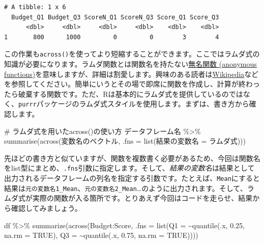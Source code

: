 \documentclass[
  a4paper,
  pandoc,
  ja=standard,
  jafont=haranoaji]{bxjsbook}
\newenvironment{Shaded}{\begin{snugshade}}{\end{snugshade}}
\newcommand{\AttributeTok}[1]{\textcolor[rgb]{0.00,0.48,0.65}{#1}}
\newcommand{\CommentTok}[1]{\textcolor[rgb]{0.37,0.37,0.37}{#1}}
\newcommand{\ConstantTok}[1]{\textcolor[rgb]{0.56,0.35,0.01}{#1}}
\newcommand{\FloatTok}[1]{\textcolor[rgb]{0.68,0.00,0.00}{#1}}
\newcommand{\FunctionTok}[1]{\textcolor[rgb]{0.28,0.35,0.67}{#1}}
\newcommand{\NormalTok}[1]{\textcolor[rgb]{0.00,0.48,0.65}{#1}}
\newcommand{\OtherTok}[1]{\textcolor[rgb]{0.00,0.48,0.65}{#1}}
\newcommand{\SpecialCharTok}[1]{\textcolor[rgb]{0.37,0.37,0.37}{#1}}
\begin{document}
\begin{verbatim}
# A tibble: 1 x 6
  Budget_Q1 Budget_Q3 ScoreN_Q1 ScoreN_Q3 Score_Q1 Score_Q3
      <dbl>     <dbl>     <dbl>     <dbl>    <dbl>    <dbl>
1       800      1000         0         0        3        4
\end{verbatim}

この作業も\texttt{across()}を使ってより短縮することができます。ここではラムダ式の知識が必要になります。ラムダ関数とは関数名を持たない\href{https://ja.wikipedia.org/wiki/無名関数}{無名関数
(anonymous
functions)}を意味しますが、詳細は割愛します。興味のある読者は\href{https://ja.wikipedia.org/wiki/無名関数}{Wikipedia}などを参照してください。簡単にいうとその場で即席に関数を作成し、計算が終わったら破棄する関数です。ただ、Rは基本的にラムダ式を提供しているのではなく、\texttt{purrr}パッケージのラムダ式スタイルを使用します。まずは、書き方から確認します。

\begin{Shaded}
\begin{Highlighting}[numbers=left,,]
\CommentTok{\# ラムダ式を用いたacross()の使い方}
\NormalTok{データフレーム名 }\SpecialCharTok{\%\textgreater{}\%}
  \FunctionTok{summarise}\NormalTok{(}\FunctionTok{across}\NormalTok{(変数名のベクトル, }\AttributeTok{.fns =} \FunctionTok{list}\NormalTok{(結果の変数名 }\OtherTok{=}\NormalTok{ ラムダ式)))}
\end{Highlighting}
\end{Shaded}

先ほどの書き方と似ていますが、関数を複数書く必要があるため、今回は関数名をlist型にまとめ、\texttt{.fns}引数に指定します。そして、\emph{結果の変数名}は結果として出力されるデータフレームの列名を指定する引数です。たとえば、\texttt{Mean}にすると結果は\texttt{元の変数名1\_Mean}、\texttt{元の変数名2\_Mean}\ldots のように出力されます。そして、ラムダ式が実際の関数が入る箇所です。とりあえず今回はコードを走らせ、結果から確認してみましょう。

\begin{Shaded}
\begin{Highlighting}[numbers=left,,]
\NormalTok{df }\SpecialCharTok{\%\textgreater{}\%}
  \FunctionTok{summarize}\NormalTok{(}\FunctionTok{across}\NormalTok{(Budget}\SpecialCharTok{:}\NormalTok{Score, }
                   \AttributeTok{.fns =} \FunctionTok{list}\NormalTok{(}\AttributeTok{Q1 =} \SpecialCharTok{\textasciitilde{}}\FunctionTok{quantile}\NormalTok{(.x, }\FloatTok{0.25}\NormalTok{, }\AttributeTok{na.rm =} \ConstantTok{TRUE}\NormalTok{),}
                               \AttributeTok{Q3 =} \SpecialCharTok{\textasciitilde{}}\FunctionTok{quantile}\NormalTok{(.x, }\FloatTok{0.75}\NormalTok{, }\AttributeTok{na.rm =} \ConstantTok{TRUE}\NormalTok{))))}
\end{Highlighting}
\end{Shaded}
\end{document}
